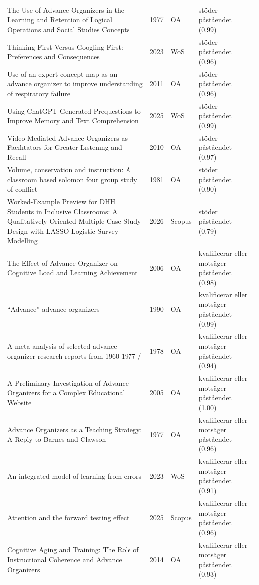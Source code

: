 \begin{longtable}{@{}%
  >{\raggedright\arraybackslash}p{}c%
  >{\raggedright\arraybackslash}p{}%
  >{\raggedright\arraybackslash}p{}@{}}
The Use of Advance Organizers in the Learning and Retention of Logical Operations and Social Studies Concepts & 1977 & OA & stöder påståendet (0.99) \\
Thinking First Versus Googling First: Preferences and Consequences & 2023 & WoS & stöder påståendet (0.96) \\
Use of an expert concept map as an advance organizer to improve understanding of respiratory failure & 2011 & OA & stöder påståendet (0.96) \\
Using ChatGPT-Generated Prequestions to Improve Memory and Text Comprehension & 2025 & WoS & stöder påståendet (0.99) \\
Video-Mediated Advance Organizers as Facilitators for Greater Listening and Recall & 2010 & OA & stöder påståendet (0.97) \\
Volume, conservation and instruction: A classroom based solomon four group study of conflict & 1981 & OA & stöder påståendet (0.90) \\
Worked-Example Preview for DHH Students in Inclusive Classrooms: A Qualitatively Oriented Multiple-Case Study Design with LASSO-Logistic Survey Modelling & 2026 & Scopus & stöder påståendet (0.79) \\
\textquotedbl{}The Effect of Advance Organizer on Cognitive Load and Learning Achievement\textquotedbl{} & 2006 & OA & kvalificerar eller motsäger påståendet (0.98) \\
``Advance'' advance organizers & 1990 & OA & kvalificerar eller motsäger påståendet (0.99) \\
A meta-analysis of selected advance organizer research reports from 1960-1977 / & 1978 & OA & kvalificerar eller motsäger påståendet (0.94) \\
A Preliminary Investigation of Advance Organizers for a Complex Educational Website & 2005 & OA & kvalificerar eller motsäger påståendet (1.00) \\
Advance Organizers as a Teaching Strategy: A Reply to Barnes and Clawson & 1977 & OA & kvalificerar eller motsäger påståendet (0.96) \\
An integrated model of learning from errors & 2023 & WoS & kvalificerar eller motsäger påståendet (0.91) \\
Attention and the forward testing effect & 2025 & Scopus & kvalificerar eller motsäger påståendet (0.96) \\
Cognitive Aging and Training: The Role of Instructional Coherence and Advance Organizers & 2014 & OA & kvalificerar eller motsäger påståendet (0.93) \\

\end{longtable}
